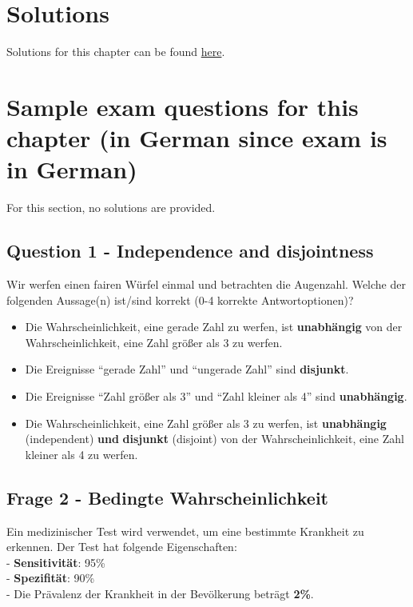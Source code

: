 \documentclass[
]{book}
\begin{document}
\section{Solutions}\label{solutions}

Solutions for this chapter can be found \href{https://github.com/jdegenfellner/Script_QM1_ZHAW/tree/main/Solutions_to_Exercises/2_Probability}{here}.

\section{Sample exam questions for this chapter (in German since exam is in German)}\label{sample-exam-questions-for-this-chapter-in-german-since-exam-is-in-german}

For this section, no solutions are provided.

\subsection{Question 1 - Independence and disjointness}\label{question-1---independence-and-disjointness}

Wir werfen einen fairen Würfel einmal und betrachten die Augenzahl. Welche der folgenden Aussage(n) ist/sind korrekt (0-4 korrekte Antwortoptionen)?

\begin{itemize}
\item
  Die Wahrscheinlichkeit, eine gerade Zahl zu werfen, ist \textbf{unabhängig} von der Wahrscheinlichkeit, eine Zahl größer als 3 zu werfen.
\item
  Die Ereignisse ``gerade Zahl'' und ``ungerade Zahl'' sind \textbf{disjunkt}.
\item
  Die Ereignisse ``Zahl größer als 3'' und ``Zahl kleiner als 4'' sind \textbf{unabhängig}.
\item
  Die Wahrscheinlichkeit, eine Zahl größer als 3 zu werfen, ist \textbf{unabhängig} (independent) \textbf{und}
  \textbf{disjunkt} (disjoint) von der Wahrscheinlichkeit, eine Zahl kleiner als 4 zu werfen.
\end{itemize}

\subsection{Frage 2 - Bedingte Wahrscheinlichkeit}\label{frage-2---bedingte-wahrscheinlichkeit}

Ein medizinischer Test wird verwendet, um eine bestimmte Krankheit zu erkennen. Der Test hat folgende Eigenschaften:\\
- \textbf{Sensitivität}: 95\%\\
- \textbf{Spezifität}: 90\%\\
- Die Prävalenz der Krankheit in der Bevölkerung beträgt \textbf{2\%}.
\end{document}
